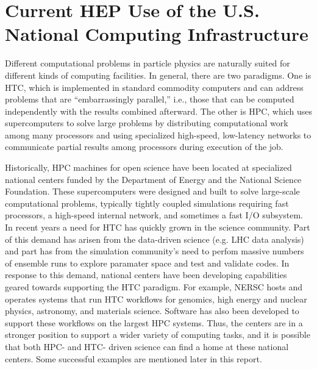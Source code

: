 \section{Current HEP Use of the U.S. National Computing Infrastructure}

Different computational problems in particle physics are naturally suited for different kinds of computing facilities.  In general, there are two paradigms.  One is HTC, which is implemented in standard commodity computers and can address problems that are ``embarrassingly parallel,'' i.e., those that can be computed independently with the results combined afterward.  The other is HPC, which uses supercomputers to solve large problems by distributing computational work among many processors and using specialized high-speed, low-latency networks to communicate partial results among processors during execution of the job.

Historically, HPC machines for open science have been located at specialized national centers funded by the 
Department of Energy and the National 
Science Foundation. These supercomputers were designed and built to solve large-scale computational problems, 
typically tightly coupled simulations requiring fast processors, a high-speed internal network, and sometimes a 
fast I/O subsystem. In recent years a need for HTC has quickly grown in the science community. Part of this demand has arisen from
the data-driven science (e.g. LHC data analysis) and part has from the simulation community's need to perfom 
massive numbers of ensemble runs to explore paramater space and test and validate codes. 
In response to this demand, national centers have been developing capabilities geared towards supporting the HTC paradigm.  
For example, NERSC hosts and operates systems that run HTC workflows for genomics, high energy and nuclear physics,
astronomy, and materials science. Software has also been developed to support these workflows on the largest HPC systems.
Thus, the centers are in a stronger position to support a wider variety of computing tasks, and it is possible that both HPC- and HTC- driven science can find a home at these national centers.  Some successful examples are mentioned later in this report.

